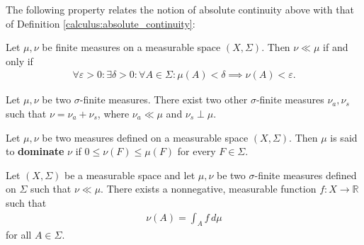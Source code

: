     The following property relates the notion of absolute continuity above with that of Definition \ref{calculus:absolute_continuity}:
    \begin{property}
        Let $\mu,\nu$ be finite measures on a measurable space $(X,\Sigma)$. Then $\nu\ll\mu$ if and only if
        \begin{gather}
            \forall\varepsilon>0:\exists\delta>0:\forall A\in\Sigma:\mu(A)<\delta\implies\nu(A)<\varepsilon.
        \end{gather}
    \end{property}

    \begin{theorem}
        Let $\mu,\nu$ be two $\sigma$-finite measures. There exist two other $\sigma$-finite measures $\nu_a,\nu_s$ such that $\nu=\nu_a+\nu_s$, where $\nu_a\ll\mu$ and $\nu_s\perp\mu$.
    \end{theorem}

    \begin{definition}
        Let $\mu,\nu$ be two measures defined on a measurable space $(X,\Sigma)$. Then $\mu$ is said to \textbf{dominate} $\nu$ if $0\leq\nu(F)\leq\mu(F)$ for every $F\in\Sigma$.
    \end{definition}

    \begin{theorem}\label{lebesgue:radon_nikodym}
        Let $(X,\Sigma)$ be a measurable space and let $\mu,\nu$ be two $\sigma$-finite measures defined on $\Sigma$ such that $\nu\ll\mu$. There exists a nonnegative, measurable function $f:X\rightarrow\mathbb{R}$ such that
        \begin{gather}
            \nu(A) = \int_Af\,d\mu
        \end{gather}
        for all $A\in\Sigma$.
    \end{theorem}

